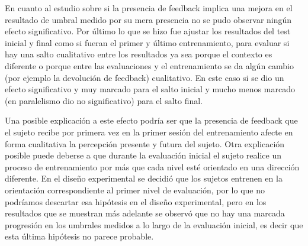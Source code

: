 \documentclass{article}
\numberwithin{figure}{section}
\begin{document}
    En cuanto al estudio sobre si la presencia de feedback implica una mejora en el resultado de umbral medido por su mera presencia no se pudo observar ningún efecto significativo. Por último lo que se hizo fue ajustar los resultados del test inicial y final como si fueran el primer y último entrenamiento, para evaluar si hay una salto cualitativo entre los resultados ya sea porque el contexto es diferente o porque entre las evaluaciones y el entrenamiento se da algún cambio (por ejemplo la devolución de feedback) cualitativo. En este caso si se dio un efecto significativo y muy marcado para el salto inicial y mucho menos marcado (en paralelismo dio no significativo) para el salto final. 
    
    Una posible explicación a este efecto podría ser que la presencia de feedback que el sujeto recibe por primera vez en la primer sesión del entrenamiento afecte en forma cualitativa la percepción presente y futura del sujeto. Otra explicación posible puede deberse a que durante la evaluación inicial el sujeto realice un proceso de entrenamiento por más que cada nivel esté orientado en una dirección diferente. En el diseño experimental se decidió que los sujetos entrenen en la orientación correspondiente al primer nivel de evaluación, por lo que no podríamos descartar esa hipótesis en el diseño experimental, pero en los resultados que se muestran más adelante se observó que no hay una marcada progresión en los umbrales medidos a lo largo de la evaluación inicial, es decir que esta última hipótesis no parece probable. 



\end{document}
